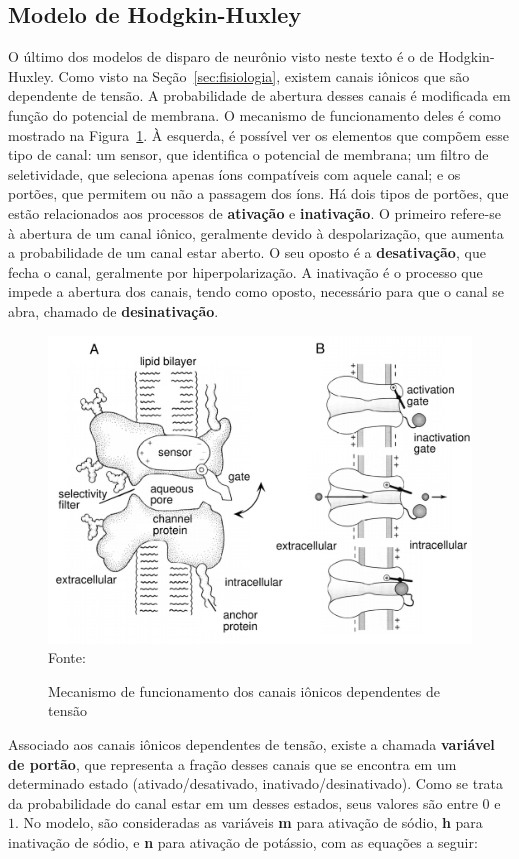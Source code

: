 \subsection{Modelo de Hodgkin-Huxley}\label{sec:modelohh}
O último dos modelos de disparo de neurônio visto neste texto é o de Hodgkin-Huxley.
Como visto na Seção~\ref{sec:fisiologia}, existem canais iônicos que são dependente de tensão. A probabilidade de abertura desses canais é modificada em função do potencial de membrana. O mecanismo de funcionamento deles é como mostrado na Figura~\ref{fig:canais}. À esquerda, é possível ver os elementos que compõem esse tipo de canal: um sensor, que identifica o potencial de membrana; um filtro de seletividade, que seleciona apenas íons compatíveis com aquele canal; e os portões, que permitem ou não a passagem dos íons. Há dois tipos de portões, que estão relacionados aos processos de \textbf{ativação} e \textbf{inativação}. O primeiro refere-se à abertura de um canal iônico, geralmente devido à despolarização, que aumenta a probabilidade de um canal estar aberto. O seu oposto é a \textbf{desativação}, que fecha o canal, geralmente por hiperpolarização. A inativação é o processo que impede a abertura dos canais, tendo como oposto, necessário para que o canal se abra, chamado de \textbf{desinativação}.
\cite{miller_introductory_2018}
\begin{figure}[htb!]
	\centering
	\caption{Mecanismo de funcionamento dos canais iônicos dependentes de tensão}
	\label{fig:canais}
	\includegraphics[width=0.6\linewidth]{figs/canais}\\
	\small{Fonte: \cite{dayan_theoretical_2001}}
\end{figure}
Associado aos canais iônicos dependentes de tensão, existe a chamada \textbf{variável de portão}, que representa a fração desses canais que se encontra em um determinado estado (ativado/desativado, inativado/desinativado). Como se trata da probabilidade do canal estar em um desses estados, seus valores são entre $0$ e $1$. No modelo, são consideradas as variáveis \textbf{m} para ativação de sódio, \textbf{h} para inativação de sódio, e \textbf{n} para ativação de potássio, com as equações a seguir:
